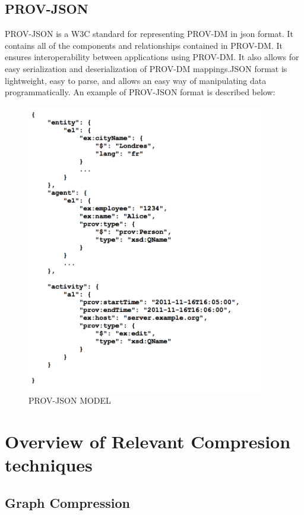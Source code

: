 \subsection{PROV-JSON}

PROV-JSON is a W3C standard for representing PROV-DM in json format. It contains all of the components and relationships contained in PROV-DM. It ensures interoperability between applications using PROV-DM. It also allows for easy serialization and deserialization of PROV-DM mappings.JSON format is lightweight, easy to parse, and allows an easy way of manipulating data programmatically. An example of PROV-JSON format is described below:

\begin{figure}[h]
\begin{center}

\includegraphics[height=5in]{prov_json.png}
\end{center}
\caption{PROV-JSON MODEL}

\end{figure}



\section{Overview of Relevant Compresion techniques}


\subsection{Graph Compression}


